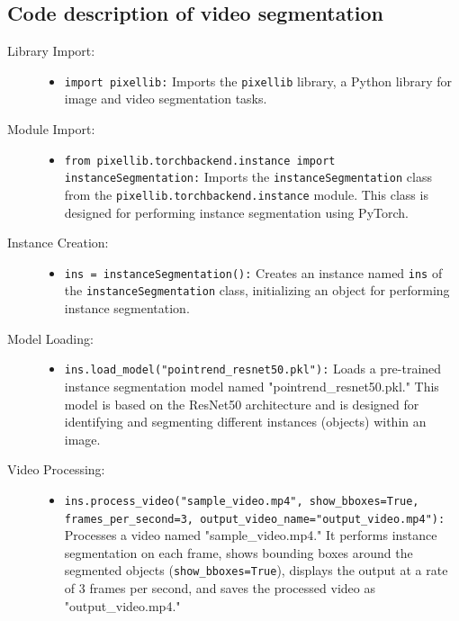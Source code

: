 \subsection*{Code description of video segmentation}	
\begin{description}
    \item[Library Import:]
    \begin{itemize}
        \item \texttt{import pixellib:} Imports the \texttt{pixellib} library, a Python library for image and video segmentation tasks.
    \end{itemize}
    
    \item[Module Import:]
    \begin{itemize}
        \item \texttt{from pixellib.torchbackend.instance import instanceSegmentation:} Imports the \texttt{instanceSegmentation} class from the \texttt{pixellib.torchbackend.instance} module. This class is designed for performing instance segmentation using PyTorch.
    \end{itemize}
    
    \item[Instance Creation:]
    \begin{itemize}
        \item \texttt{ins = instanceSegmentation():} Creates an instance named \texttt{ins} of the \texttt{instanceSegmentation} class, initializing an object for performing instance segmentation.
    \end{itemize}
    
    \item[Model Loading:]
    \begin{itemize}
        \item \texttt{ins.load\_model("pointrend\_resnet50.pkl"):} Loads a pre-trained instance segmentation model named "pointrend\_resnet50.pkl." This model is based on the ResNet50 architecture and is designed for identifying and segmenting different instances (objects) within an image.
    \end{itemize}
    
    \item[Video Processing:]
    \begin{itemize}
        \item \texttt{ins.process\_video("sample\_video.mp4", show\_bboxes=True, frames\_per\_second=3, output\_video\_name="output\_video.mp4"):} Processes a video named "sample\_video.mp4." It performs instance segmentation on each frame, shows bounding boxes around the segmented objects (\texttt{show\_bboxes=True}), displays the output at a rate of 3 frames per second, and saves the processed video as "output\_video.mp4."
    \end{itemize}
\end{description}

